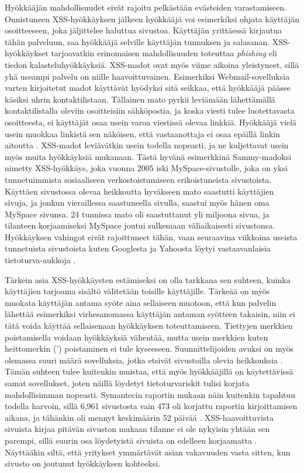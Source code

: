 Hyökkääjän mahdollisuudet eivät rajoitu pelkästään evästeiden varastamiseen. Onnistuneen XSS-hyökkäyksen jälkeen hyökkääjä voi esimerkiksi ohjata
käyttäjän osoitteeseen, joka jäljittelee haluttua sivustoa. Käyttäjän yrittäessä kirjautua tähän palveluun, saa hyökkääjä selville käyttäjän tunnuksen ja
salasanan. XSS-hyökkäykset tarjoavatkin erinomaisen mahdollisuuden toteuttaa \textit{phishing} eli tiedon kalasteluhyökkäyksiä. XSS-\-madot ovat
myös viime aikoina yleistyneet, sillä yhä useampi palvelu on niille haavoittuvainen. Esimerkiksi Webmail-sovelluksia varten kirjoitetut madot 
käyttävät hyödyksi sitä seikkaa, että hyökkääjä pääsee käsiksi uhrin kontaktilistaan. Tällainen mato pyrkii leviämään lähettämällä 
kontaktilistalla oleviin osoitteisiin sähköpostia, ja koska viesti tulee luotettavasta osoitteesta, ei käyttäjät osaa usein varoa viestissä
olevaa linkkiä. Hyökkääjä vielä usein muokkaa linkistä sen näköisen, että vastaanottaja ei osaa epäillä linkin aitoutta \cite{WEB2}. 
XSS-madot leviävätkin usein todella nopeasti, ja ne kuljettavat usein myös muita hyökkäyksiä mukanaan. Tästä hyvänä esimerkkinä
Sammy-madoksi nimetty XSS-hyökkäys, joka vuonna 2005 iski MySpace-sivustolle, joka on yksi tunnetuimmista sosiaaliseen verkostoistumiseen
erikoistuneista sivustoista. Käyttäen sivustossa olevaa heikkoutta hyväkseen mato saastutti käyttäjien sivuja, ja jonkun vieraillessa 
saastuneella sivulla, saastui myös hänen oma MySpace sivunsa. 24 tunnissa mato oli saastuttanut yli miljoona sivua, ja tilanteen korjaamiseksi
MySpace joutui sulkemaan väliaikaisesti sivustonsa. Hyökkäyksen vahingot eivät rajoittuneet tähän, vaan seuraavina viikkoina useista tunnetuista sivustoista
kuten Googlesta ja Yahoosta löytyi vastaavanlaisia tietoturva-aukkoja \cite{WEB2b}.

Tärkein asia XSS-hyökkäysten estämiseksi on olla tarkkana sen suhteen, kuinka käyttäjien tarjoama sisältö välitetään toisille käyttäjille.
Tärkeää on myös muokata käyttäjän antama syöte aina sellaiseen muotoon, että kun palvelin lähettää esimerkiksi virhesanomassa käyttäjän antaman syötteen
takaisin, niin ei tätä voida käyttää sellaisenaan hyökkäyksen toteuttamiseen. Tiettyjen merkkien poistamisella voidaan hyökkäyksiä vähentää,
mutta usein merkkien kuten heittomerkin (') poistaminen ei tule kyseeseen. Suunnittelijoiden avuksi on myös olemassa suuri määrä sovelluksia, jotka
etsivät sivustoilla olevia heikkouksia \cite{WEB2}. Tämän suhteen tulee kuitenkin muistaa, että myös hyökkääjillä on käytettävissä samat sovellukset, joten 
näillä löydetyt tietoturvariskit tulisi korjata mahdollisimman nopeasti. Symantecin raportin mukaan näin kuitenkin tapahtuu todella harvoin, sillä 6,961 
sivustosta vain 473 oli korjattu raportin kirjoittamisen aikana, ja tähänkin oli mennyt keskimäärin 52 päivää \cite{SYM}. XSS-haavoittuvista sivuista
kirjaa pitävän sivuston mukaan tilanne ei ole nykyisin yhtään sen parempi, sillä suurin osa löydetyistä sivuista on edelleen korjaamatta \cite{XSS}.
Näyttääkin siltä, että yritykset ymmärtävät asian vakavuuden vasta sitten, kun sivusto on joutunut hyökkäyksen kohteeksi.

